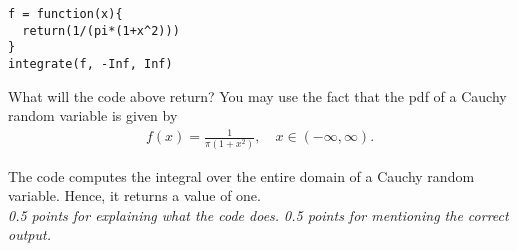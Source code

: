\begin{verbatim}
f = function(x){
  return(1/(pi*(1+x^2)))
}
integrate(f, -Inf, Inf)
\end{verbatim}

\begin{exercise}[1]
What will the code above return? You may use the fact that the pdf of a Cauchy random variable is given by
\begin{align*}
    f(x) = \frac{1}{\pi(1 + x^2)}, \quad x \in (-\infty, \infty).
\end{align*}
\begin{solution}
The code computes the integral over the entire domain of a Cauchy random variable. Hence, it returns a value of one.\\
\textit{0.5 points for explaining what the code does. 0.5 points for mentioning the correct output.}
\end{solution}
\end{exercise}
